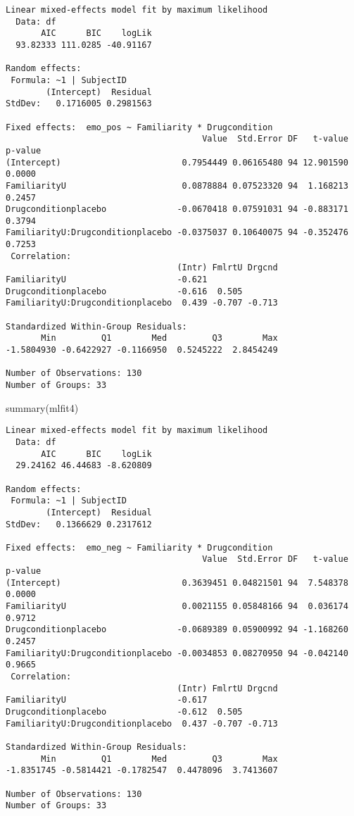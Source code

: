 \documentclass[
  man,
  longtable,
  nolmodern,
  notxfonts,
  notimes,
  colorlinks=true,linkcolor=blue,citecolor=blue,urlcolor=blue]{apa7}
\newenvironment{Shaded}{\begin{snugshade}}{\end{snugshade}}
\newcommand{\FunctionTok}[1]{\textcolor[rgb]{0.28,0.35,0.67}{#1}}
\newcommand{\NormalTok}[1]{\textcolor[rgb]{0.00,0.23,0.31}{#1}}
\begin{document}
\begin{verbatim}
Linear mixed-effects model fit by maximum likelihood
  Data: df 
       AIC      BIC    logLik
  93.82333 111.0285 -40.91167

Random effects:
 Formula: ~1 | SubjectID
        (Intercept)  Residual
StdDev:   0.1716005 0.2981563

Fixed effects:  emo_pos ~ Familiarity * Drugcondition 
                                       Value  Std.Error DF   t-value p-value
(Intercept)                        0.7954449 0.06165480 94 12.901590  0.0000
FamiliarityU                       0.0878884 0.07523320 94  1.168213  0.2457
Drugconditionplacebo              -0.0670418 0.07591031 94 -0.883171  0.3794
FamiliarityU:Drugconditionplacebo -0.0375037 0.10640075 94 -0.352476  0.7253
 Correlation: 
                                  (Intr) FmlrtU Drgcnd
FamiliarityU                      -0.621              
Drugconditionplacebo              -0.616  0.505       
FamiliarityU:Drugconditionplacebo  0.439 -0.707 -0.713

Standardized Within-Group Residuals:
       Min         Q1        Med         Q3        Max 
-1.5804930 -0.6422927 -0.1166950  0.5245222  2.8454249 

Number of Observations: 130
Number of Groups: 33 
\end{verbatim}

\begin{Shaded}
\begin{Highlighting}[]
\FunctionTok{summary}\NormalTok{(mlfit4)}
\end{Highlighting}
\end{Shaded}

\begin{verbatim}
Linear mixed-effects model fit by maximum likelihood
  Data: df 
       AIC      BIC    logLik
  29.24162 46.44683 -8.620809

Random effects:
 Formula: ~1 | SubjectID
        (Intercept)  Residual
StdDev:   0.1366629 0.2317612

Fixed effects:  emo_neg ~ Familiarity * Drugcondition 
                                       Value  Std.Error DF   t-value p-value
(Intercept)                        0.3639451 0.04821501 94  7.548378  0.0000
FamiliarityU                       0.0021155 0.05848166 94  0.036174  0.9712
Drugconditionplacebo              -0.0689389 0.05900992 94 -1.168260  0.2457
FamiliarityU:Drugconditionplacebo -0.0034853 0.08270950 94 -0.042140  0.9665
 Correlation: 
                                  (Intr) FmlrtU Drgcnd
FamiliarityU                      -0.617              
Drugconditionplacebo              -0.612  0.505       
FamiliarityU:Drugconditionplacebo  0.437 -0.707 -0.713

Standardized Within-Group Residuals:
       Min         Q1        Med         Q3        Max 
-1.8351745 -0.5814421 -0.1782547  0.4478096  3.7413607 

Number of Observations: 130
Number of Groups: 33 
\end{verbatim}
\end{document}
